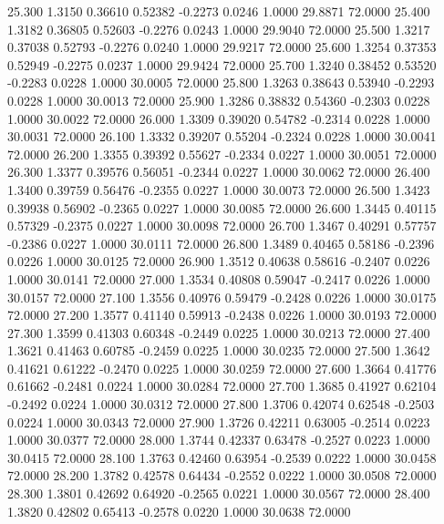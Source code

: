   25.300   1.3150   0.36610   0.52382  -0.2273   0.0246   1.0000  29.8871  72.0000
  25.400   1.3182   0.36805   0.52603  -0.2276   0.0243   1.0000  29.9040  72.0000
  25.500   1.3217   0.37038   0.52793  -0.2276   0.0240   1.0000  29.9217  72.0000
  25.600   1.3254   0.37353   0.52949  -0.2275   0.0237   1.0000  29.9424  72.0000
  25.700   1.3240   0.38452   0.53520  -0.2283   0.0228   1.0000  30.0005  72.0000
  25.800   1.3263   0.38643   0.53940  -0.2293   0.0228   1.0000  30.0013  72.0000
  25.900   1.3286   0.38832   0.54360  -0.2303   0.0228   1.0000  30.0022  72.0000
  26.000   1.3309   0.39020   0.54782  -0.2314   0.0228   1.0000  30.0031  72.0000
  26.100   1.3332   0.39207   0.55204  -0.2324   0.0228   1.0000  30.0041  72.0000
  26.200   1.3355   0.39392   0.55627  -0.2334   0.0227   1.0000  30.0051  72.0000
  26.300   1.3377   0.39576   0.56051  -0.2344   0.0227   1.0000  30.0062  72.0000
  26.400   1.3400   0.39759   0.56476  -0.2355   0.0227   1.0000  30.0073  72.0000
  26.500   1.3423   0.39938   0.56902  -0.2365   0.0227   1.0000  30.0085  72.0000
  26.600   1.3445   0.40115   0.57329  -0.2375   0.0227   1.0000  30.0098  72.0000
  26.700   1.3467   0.40291   0.57757  -0.2386   0.0227   1.0000  30.0111  72.0000
  26.800   1.3489   0.40465   0.58186  -0.2396   0.0226   1.0000  30.0125  72.0000
  26.900   1.3512   0.40638   0.58616  -0.2407   0.0226   1.0000  30.0141  72.0000
  27.000   1.3534   0.40808   0.59047  -0.2417   0.0226   1.0000  30.0157  72.0000
  27.100   1.3556   0.40976   0.59479  -0.2428   0.0226   1.0000  30.0175  72.0000
  27.200   1.3577   0.41140   0.59913  -0.2438   0.0226   1.0000  30.0193  72.0000
  27.300   1.3599   0.41303   0.60348  -0.2449   0.0225   1.0000  30.0213  72.0000
  27.400   1.3621   0.41463   0.60785  -0.2459   0.0225   1.0000  30.0235  72.0000
  27.500   1.3642   0.41621   0.61222  -0.2470   0.0225   1.0000  30.0259  72.0000
  27.600   1.3664   0.41776   0.61662  -0.2481   0.0224   1.0000  30.0284  72.0000
  27.700   1.3685   0.41927   0.62104  -0.2492   0.0224   1.0000  30.0312  72.0000
  27.800   1.3706   0.42074   0.62548  -0.2503   0.0224   1.0000  30.0343  72.0000
  27.900   1.3726   0.42211   0.63005  -0.2514   0.0223   1.0000  30.0377  72.0000
  28.000   1.3744   0.42337   0.63478  -0.2527   0.0223   1.0000  30.0415  72.0000
  28.100   1.3763   0.42460   0.63954  -0.2539   0.0222   1.0000  30.0458  72.0000
  28.200   1.3782   0.42578   0.64434  -0.2552   0.0222   1.0000  30.0508  72.0000
  28.300   1.3801   0.42692   0.64920  -0.2565   0.0221   1.0000  30.0567  72.0000
  28.400   1.3820   0.42802   0.65413  -0.2578   0.0220   1.0000  30.0638  72.0000

